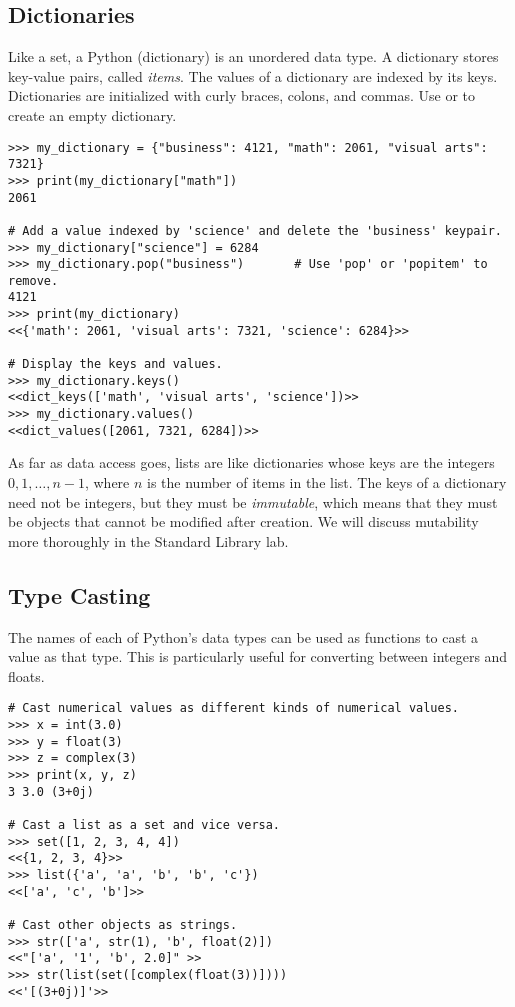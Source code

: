 \subsection*{Dictionaries} %

Like a set, a Python  (dictionary) is an unordered data type.
A dictionary stores key-value pairs, called \emph{items}.
The values of a dictionary are indexed by its keys.
Dictionaries are initialized with curly braces, colons, and commas.
Use  or \li{\{\}} to create an empty dictionary.

\begin{lstlisting}
>>> my_dictionary = {"business": 4121, "math": 2061, "visual arts": 7321}
>>> print(my_dictionary["math"])
2061

# Add a value indexed by 'science' and delete the 'business' keypair.
>>> my_dictionary["science"] = 6284
>>> my_dictionary.pop("business")       # Use 'pop' or 'popitem' to remove.
4121
>>> print(my_dictionary)
<<{'math': 2061, 'visual arts': 7321, 'science': 6284}>>

# Display the keys and values.
>>> my_dictionary.keys()
<<dict_keys(['math', 'visual arts', 'science'])>>
>>> my_dictionary.values()
<<dict_values([2061, 7321, 6284])>>
\end{lstlisting}

As far as data access goes, lists are like dictionaries whose keys are the integers $0,1,\ldots,n-1$, where $n$ is the number of items in the list.
The keys of a dictionary need not be integers, but they must be \emph{immutable}, which means that they must be objects that cannot be modified after creation.
We will discuss mutability more thoroughly in the Standard Library lab.

\subsection*{Type Casting} %

The names of each of Python's data types can be used as functions to cast a value as that type.
This is particularly useful for converting between integers and floats.

\begin{lstlisting}
# Cast numerical values as different kinds of numerical values.
>>> x = int(3.0)
>>> y = float(3)
>>> z = complex(3)
>>> print(x, y, z)
3 3.0 (3+0j)

# Cast a list as a set and vice versa.
>>> set([1, 2, 3, 4, 4])
<<{1, 2, 3, 4}>>
>>> list({'a', 'a', 'b', 'b', 'c'})
<<['a', 'c', 'b']>>

# Cast other objects as strings.
>>> str(['a', str(1), 'b', float(2)])
<<"['a', '1', 'b', 2.0]" >>
>>> str(list(set([complex(float(3))])))
<<'[(3+0j)]'>>
\end{lstlisting}

